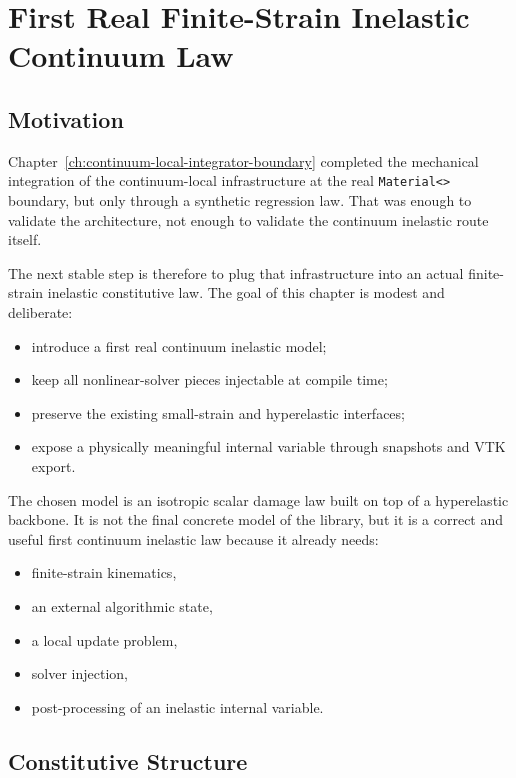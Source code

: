 \chapter{First Real Finite-Strain Inelastic Continuum Law}
\label{ch:finite-strain-damage-relation}

\section{Motivation}

Chapter~\ref{ch:continuum-local-integrator-boundary} completed the mechanical
integration of the continuum-local infrastructure at the real
\texttt{Material<>} boundary, but only through a synthetic regression law.
That was enough to validate the architecture, not enough to validate the
continuum inelastic route itself.

The next stable step is therefore to plug that infrastructure into an actual
finite-strain inelastic constitutive law.  The goal of this chapter is modest
and deliberate:
\begin{itemize}
  \item introduce a first real continuum inelastic model;
  \item keep all nonlinear-solver pieces injectable at compile time;
  \item preserve the existing small-strain and hyperelastic interfaces;
  \item expose a physically meaningful internal variable through snapshots and
        VTK export.
\end{itemize}

The chosen model is an isotropic scalar damage law built on top of a
hyperelastic backbone.  It is not the final concrete model of the library, but
it is a correct and useful first continuum inelastic law because it already
needs:
\begin{itemize}
  \item finite-strain kinematics,
  \item an external algorithmic state,
  \item a local update problem,
  \item solver injection,
  \item post-processing of an inelastic internal variable.
\end{itemize}

\section{Constitutive Structure}

